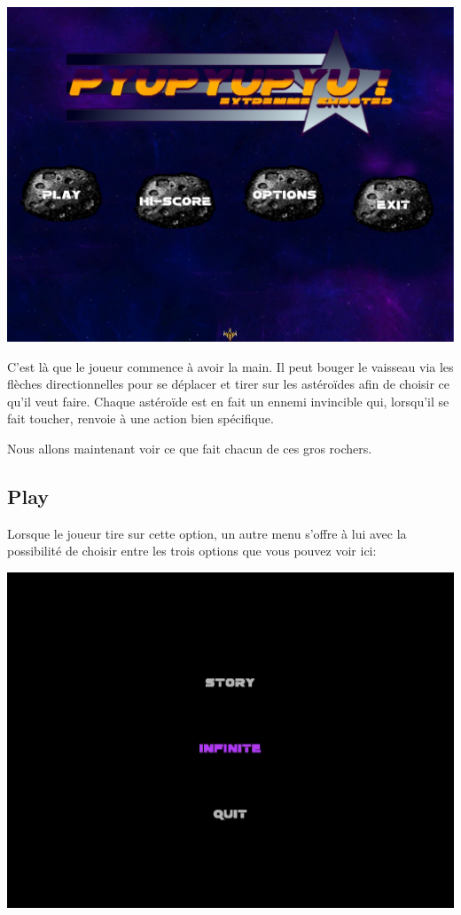 \documentclass{article}
\begin{document}
\begin{center}
\includegraphics[scale=0.5]{images/menuprinc.jpg}
\end{center}

C'est là que le joueur commence à avoir la main. Il peut bouger le vaisseau via
les flèches directionnelles pour se déplacer et tirer sur les astéroïdes afin de
choisir ce qu'il veut faire. Chaque astéroïde est en fait un ennemi invincible
qui, lorsqu'il se fait toucher, renvoie à une action bien spécifique.

Nous allons maintenant voir ce que fait chacun de ces gros rochers.

\subsection{Play}

Lorsque le joueur tire sur cette option, un autre menu s'offre à lui avec la
possibilité de choisir entre les trois options que vous pouvez voir ici:

\begin{center} \includegraphics[scale=0.5]{images/sousmenu.jpg} \end{center}
\end{document}
